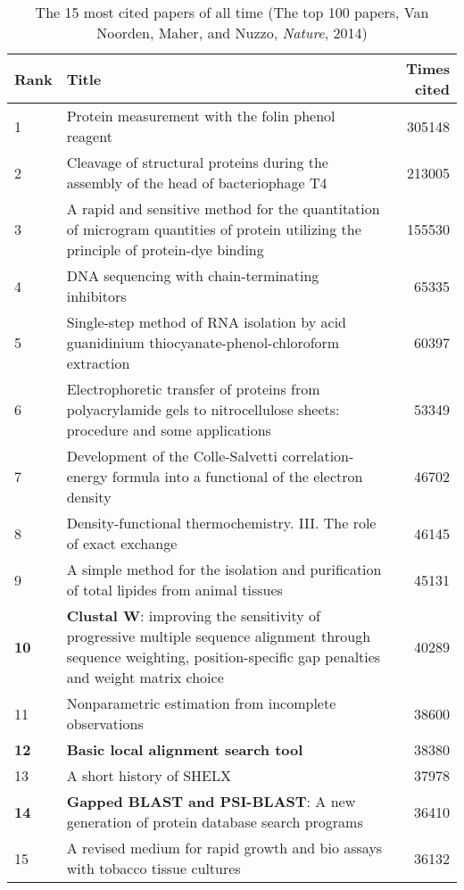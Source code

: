 \begin{table}[!ht]
\scriptsize

\begin{tabular}{l p{10cm} r}
Rank & Title& Times cited \\
\hline
1 & Protein measurement with the folin phenol reagent & 305148 \\
2 & Cleavage of structural proteins during the assembly of the head of bacteriophage T4 & 213005 \\
3 & A rapid and sensitive method for the quantitation of microgram quantities of protein utilizing the principle of protein-dye binding & 155530 \\
4 & DNA sequencing with chain-terminating inhibitors & 65335 \\
5 & Single-step method of RNA isolation by acid guanidinium thiocyanate-phenol-chloroform extraction & 60397 \\
6 & Electrophoretic transfer of proteins from polyacrylamide gels to nitrocellulose sheets: procedure and some applications & 53349 \\
7 & Development of the Colle-Salvetti correlation-energy formula into a functional of the electron density & 46702 \\
8 & Density-functional thermochemistry. III. The role of exact exchange & 46145 \\
9 & A simple method for the isolation and purification of total lipides from animal tissues & 45131 \\
\textbf{10} & \textbf{Clustal W}: improving the sensitivity of progressive multiple sequence alignment through sequence weighting, position-specific gap penalties and weight matrix choice & 40289 \\
11 & Nonparametric estimation from incomplete observations & 38600 \\
\textbf{12} & \textbf{Basic local alignment search tool} & 38380 \\
13 & A short history of SHELX & 37978 \\
\textbf{14} & \textbf{Gapped BLAST and PSI-BLAST}: A new generation of protein database search programs & 36410 \\
15 & A revised medium for rapid growth and bio assays with tobacco tissue cultures & 36132 \\
\end{tabular}
\caption{The 15 most cited papers of all time \newline (The top 100 papers, Van Noorden, Maher, and Nuzzo, \textit{Nature}, 2014)}
\end{table}

%
